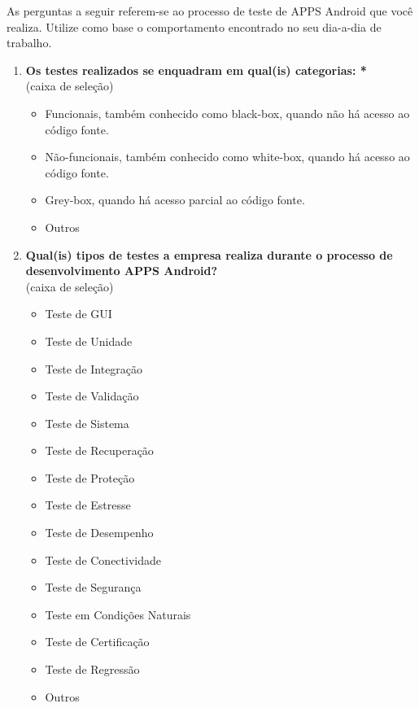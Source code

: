 \begin{enumerate}[label=\bf A\arabic*,leftmargin=1.8cm]
     
     As perguntas a seguir referem-se ao processo de teste de \ac{APPS} Android que você realiza. Utilize como base o comportamento encontrado no seu dia-a-dia de trabalho.
     
     \begin{enumerate}[label= \arabic*]
     
     \item \textbf{Os testes realizados se enquadram em qual(is) categorias: *}\\
    (caixa de seleção)
     \begin{itemize}
         \item Funcionais, também conhecido como black-box, quando não há acesso ao código fonte.
         \item Não-funcionais, também conhecido como white-box, quando há acesso ao código fonte.
         \item Grey-box, quando há acesso parcial ao código fonte.
         \item Outros
     \end{itemize}
     
    \item \textbf{Qual(is) tipos de testes a empresa realiza durante o processo de desenvolvimento \ac{APPS} Android?}\\
    (caixa de seleção)
    \begin{itemize}
        \item Teste de GUI
        \item Teste de Unidade
        \item Teste de Integração
        \item Teste de Validação
        \item Teste de Sistema
        \item Teste de Recuperação
        \item Teste de Proteção
        \item Teste de Estresse
        \item Teste de Desempenho
        \item Teste de Conectividade
        \item Teste de Segurança
        \item Teste em Condições Naturais
        \item Teste de Certificação
        \item Teste de Regressão
        \item Outros
    \end{itemize}
     

\end{enumerate}
\end{enumerate}
